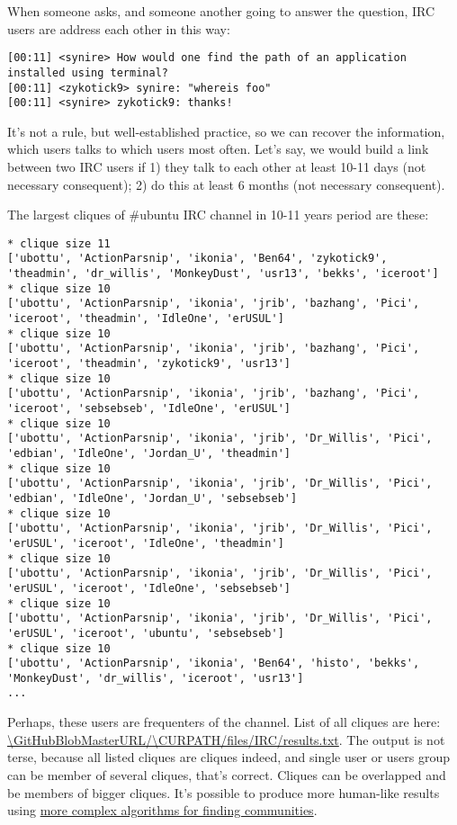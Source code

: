 When someone asks, and someone another going to answer the question, IRC users are address each other in this way:

\begin{lstlisting}
[00:11] <synire> How would one find the path of an application installed using terminal?
[00:11] <zykotick9> synire: "whereis foo"
[00:11] <synire> zykotick9: thanks!
\end{lstlisting}

It's not a rule, but well-established practice, so we can recover the information, which users talks to which users most often.
Let's say, we would build a link between two IRC users if 
1) they talk to each other at least 10-11 days (not necessary consequent);
2) do this at least 6 months (not necessary consequent).

The largest cliques of \#ubuntu IRC channel in 10-11 years period are these:

\begin{lstlisting}
* clique size 11
['ubottu', 'ActionParsnip', 'ikonia', 'Ben64', 'zykotick9', 'theadmin', 'dr_willis', 'MonkeyDust', 'usr13', 'bekks', 'iceroot']
* clique size 10
['ubottu', 'ActionParsnip', 'ikonia', 'jrib', 'bazhang', 'Pici', 'iceroot', 'theadmin', 'IdleOne', 'erUSUL']
* clique size 10
['ubottu', 'ActionParsnip', 'ikonia', 'jrib', 'bazhang', 'Pici', 'iceroot', 'theadmin', 'zykotick9', 'usr13']
* clique size 10
['ubottu', 'ActionParsnip', 'ikonia', 'jrib', 'bazhang', 'Pici', 'iceroot', 'sebsebseb', 'IdleOne', 'erUSUL']
* clique size 10
['ubottu', 'ActionParsnip', 'ikonia', 'jrib', 'Dr_Willis', 'Pici', 'edbian', 'IdleOne', 'Jordan_U', 'theadmin']
* clique size 10
['ubottu', 'ActionParsnip', 'ikonia', 'jrib', 'Dr_Willis', 'Pici', 'edbian', 'IdleOne', 'Jordan_U', 'sebsebseb']
* clique size 10
['ubottu', 'ActionParsnip', 'ikonia', 'jrib', 'Dr_Willis', 'Pici', 'erUSUL', 'iceroot', 'IdleOne', 'theadmin']
* clique size 10
['ubottu', 'ActionParsnip', 'ikonia', 'jrib', 'Dr_Willis', 'Pici', 'erUSUL', 'iceroot', 'IdleOne', 'sebsebseb']
* clique size 10
['ubottu', 'ActionParsnip', 'ikonia', 'jrib', 'Dr_Willis', 'Pici', 'erUSUL', 'iceroot', 'ubuntu', 'sebsebseb']
* clique size 10
['ubottu', 'ActionParsnip', 'ikonia', 'Ben64', 'histo', 'bekks', 'MonkeyDust', 'dr_willis', 'iceroot', 'usr13']
...
\end{lstlisting}

Perhaps, these users are frequenters of the channel. List of all cliques are here:
\url{\GitHubBlobMasterURL/\CURPATH/files/IRC/results.txt}.
The output is not terse, because all listed cliques are cliques indeed, and single user or users group can be member of several cliques, that's correct.
Cliques can be overlapped and be members of bigger cliques.
It's possible to produce more human-like results using 
\href{https://en.wikipedia.org/wiki/Community_structure#Algorithms_for_finding_communities}{more complex algorithms for finding communities}.

